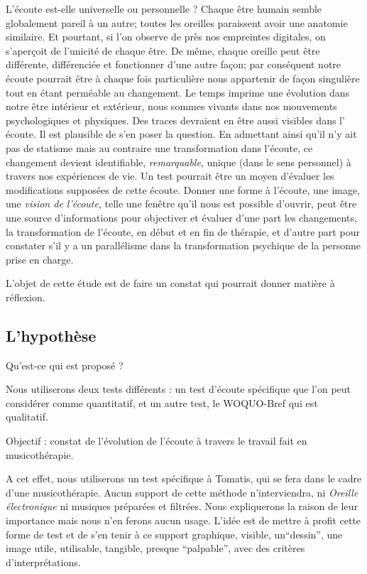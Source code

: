 L'écoute est-elle universelle ou personnelle ?
 Chaque être humain semble  globalement pareil à un autre; toutes les oreilles paraissent  avoir une anatomie similaire. Et pourtant, si l'on observe de près nos empreintes digitales, on s'aperçoit de l'unicité de chaque être. De même, chaque oreille peut être différente, différenciée et  fonctionner d'une autre façon;  par conséquent notre  écoute pourrait être à chaque fois particulière nous appartenir de façon singulière tout en étant perméable au changement.
Le temps imprime une évolution dans notre être intérieur et extérieur, nous sommes vivants dans nos mouvements psychologiques et physiques. Des traces devraient en être aussi visibles dans l' écoute. Il est plausible de s'en poser la question.
En admettant ainsi qu'il n'y ait pas de statisme mais au contraire une transformation dans l'écoute, ce changement devient identifiable, \textit{remarquable}, unique (dans le sens personnel) à travers nos expériences de vie.  Un test pourrait être un moyen d'évaluer les modifications supposées de cette écoute. 
Donner une forme à l'écoute, une image, une   \emph{vision de l'écoute}, telle une fenêtre qu'il nous est possible d'ouvrir, peut être une source d'informations pour  objectiver et évaluer d'une part 
les changements, la transformation de l'écoute, en début et en fin de thérapie, et d'autre part pour constater s'il y a un parallélisme dans la transformation psychique  de la personne prise en charge.

L'objet de cette étude est de faire un constat
qui pourrait donner matière à réflexion.


\subsection{L'hypothèse}

Qu'est-ce qui est proposé ? 
	
	Nous utiliserons deux tests différents : 
	un test d'écoute spécifique que l'on peut considérer comme quantitatif, 
	et un autre test, le WOQUO-Bref qui est qualitatif.
	
Objectif : constat de l'évolution de l'écoute à travers le travail fait en musicothérapie.

A cet effet, nous utiliserons un test spécifique à Tomatis, qui se fera dans le cadre d'une musicothérapie. Aucun support de cette méthode n'interviendra, ni \textsl{Oreille
	électronique} ni musiques préparées et filtrées. Nous expliquerons la raison de   leur importance mais nous n'en ferons aucun usage. L'idée est de mettre à profit cette forme de test et de  s'en tenir à ce support
graphique, visible, un``dessin'', une image utile, utilisable, tangible,
presque ``palpable'', avec des critères
d'interprétations.
	



